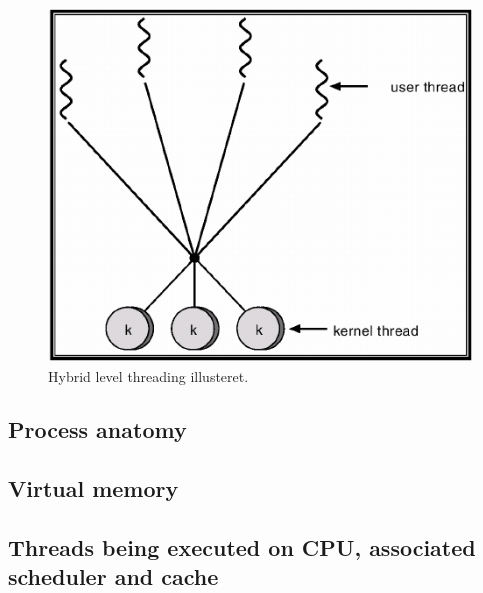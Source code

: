 \begin{figure}[h]
	\centering
	\includegraphics[width=0.7\linewidth]{figs/hybridthreads}
	\caption{Hybrid level threading illusteret.}
	\label{fig:hybridthreads}
\end{figure}

\subsection{Process anatomy}
\subsection{Virtual memory}
\subsection{Threads being executed on CPU, associated scheduler and cache}







